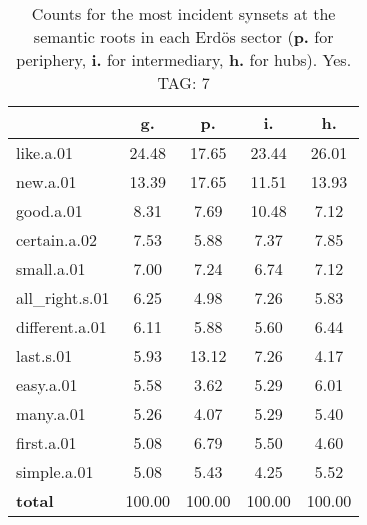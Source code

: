 \begin{table}[h!]
\begin{center}
\begin{tabular}{| l | c | c | c | c |}\hline
 & g. & p. & i. & h. \\\hline
like.a.01 & 24.48  & 17.65  & 23.44  & 26.01 \\\hline
new.a.01 & 13.39  & 17.65  & 11.51  & 13.93 \\\hline
good.a.01 & 8.31  & 7.69  & 10.48  & 7.12 \\\hline
certain.a.02 & 7.53  & 5.88  & 7.37  & 7.85 \\\hline
small.a.01 & 7.00  & 7.24  & 6.74  & 7.12 \\\hline
all\_right.s.01 & 6.25  & 4.98  & 7.26  & 5.83 \\\hline
different.a.01 & 6.11  & 5.88  & 5.60  & 6.44 \\\hline
last.s.01 & 5.93  & 13.12  & 7.26  & 4.17 \\\hline
easy.a.01 & 5.58  & 3.62  & 5.29  & 6.01 \\\hline
many.a.01 & 5.26  & 4.07  & 5.29  & 5.40 \\\hline
first.a.01 & 5.08  & 6.79  & 5.50  & 4.60 \\\hline
simple.a.01 & 5.08  & 5.43  & 4.25  & 5.52 \\\hline
{{\bf total}} & 100.00  & 100.00  & 100.00  & 100.00 \\\hline
\end{tabular}
\caption{Counts for the most incident synsets at the semantic roots in each Erd\"os sector ({\bf p.} for periphery, {\bf i.} for intermediary, {\bf h.} for hubs). Yes. TAG: 7}
\end{center}
\end{table}